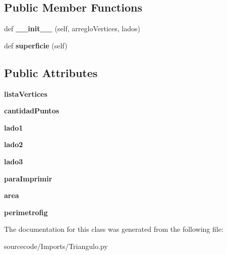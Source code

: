 \subsection*{Public Member Functions}
\begin{DoxyCompactItemize}
\item 
\mbox{\label{class_imports_1_1_triangulo_1_1_equilatero_a640a63b933bc810451a37f5f5b6e9977}} 
def {\bfseries \+\_\+\+\_\+init\+\_\+\+\_\+} (self, arreglo\+Vertices, lados)
\item 
\mbox{\label{class_imports_1_1_triangulo_1_1_equilatero_a515fef26b3975166e66bcfbd52b7b2f0}} 
def {\bfseries superficie} (self)
\end{DoxyCompactItemize}
\subsection*{Public Attributes}
\begin{DoxyCompactItemize}
\item 
\mbox{\label{class_imports_1_1_triangulo_1_1_equilatero_a8ac8c9dbd59aa6842cdd686c090aee52}} 
{\bfseries lista\+Vertices}
\item 
\mbox{\label{class_imports_1_1_triangulo_1_1_equilatero_a0f2fd8d12fee7c10b42559043c6b0d74}} 
{\bfseries cantidad\+Puntos}
\item 
\mbox{\label{class_imports_1_1_triangulo_1_1_equilatero_afd547d9f5a0b18b37975c2e4d0f5dd72}} 
{\bfseries lado1}
\item 
\mbox{\label{class_imports_1_1_triangulo_1_1_equilatero_aca1d78b3d23c2a7fb148f38a6b607b49}} 
{\bfseries lado2}
\item 
\mbox{\label{class_imports_1_1_triangulo_1_1_equilatero_a099e1644d2a182e4c632d65cbfe5d581}} 
{\bfseries lado3}
\item 
\mbox{\label{class_imports_1_1_triangulo_1_1_equilatero_a6be6238b62b3ca8e2016901f992941a6}} 
{\bfseries para\+Imprimir}
\item 
\mbox{\label{class_imports_1_1_triangulo_1_1_equilatero_ac6ff67ebd27f2fa743ee4ba4df4d8ac0}} 
{\bfseries area}
\item 
\mbox{\label{class_imports_1_1_triangulo_1_1_equilatero_a57faa1ef039533e40a319df3fe7124fc}} 
{\bfseries perimetrofig}
\end{DoxyCompactItemize}


The documentation for this class was generated from the following file\+:\begin{DoxyCompactItemize}
\item 
sourcecode/\+Imports/Triangulo.\+py\end{DoxyCompactItemize}
